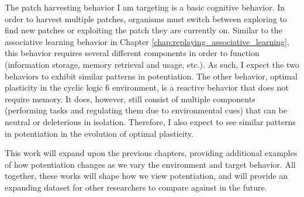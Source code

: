 The patch harvesting behavior I am targeting is a basic cognitive behavior. 
In order to harvest multiple patches, organisms must switch between exploring to find new patches or exploiting the patch they are currently on. %
Similar to the associative learning behavior in Chapter \ref{chap:replaying_associative_learning}, this behavior requires several different components in order to function (information storage, memory retrieval and usage, etc.).
As such, I expect the two behaviors to exhibit similar patterns in potentiation. 
The other behavior, optimal plasticity in the cyclic logic 6 environment, is a reactive behavior that does not require memory. %
It does, however, still consist of multiple components (performing tasks and regulating them due to environmental cues) that can be neutral or deleterious in isolation. 
Therefore, I also expect to see similar patterns in potentiation in the evolution of optimal plasticity. %

This work will expand upon the previous chapters, providing additional examples of how potentiation changes as we vary the environment and target behavior. 
All together, these works will shape how we view potentiation, and will provide an expanding dataset for other researchers to compare against in the future. 


